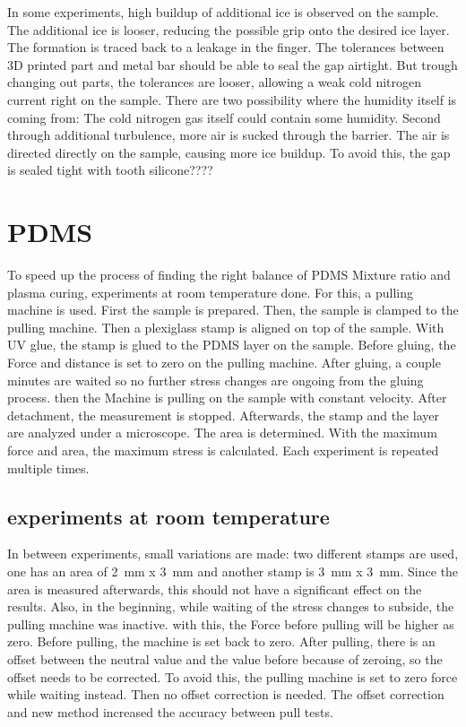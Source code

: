 In some experiments, high buildup of additional ice is observed on the sample. The additional ice is looser, reducing the possible grip onto the desired ice layer. The formation is traced back to a leakage in the finger. The tolerances between 3D printed part and metal bar should be able to seal the gap airtight. But trough changing out parts, the tolerances are looser, allowing a weak cold nitrogen current right on the sample. There are two possibility where the humidity itself is coming from: The cold nitrogen gas itself could contain some humidity. Second through additional turbulence, more air is sucked through the barrier. The air is directed directly on the sample, causing more ice buildup. To avoid this, the gap is sealed tight with tooth silicone????


\section{PDMS}

To speed up the process of finding the right balance of PDMS Mixture ratio and plasma curing, experiments at room temperature done. For this, a pulling machine is used. First the sample is prepared. Then, the sample is clamped to the pulling machine. Then a plexiglass stamp is aligned on top of the sample. With UV glue, the stamp is glued to the PDMS layer on the sample. Before gluing, the Force and distance is set to zero on the pulling machine. After gluing, a couple minutes are waited so no further stress changes are ongoing from the gluing process. then the Machine is pulling on the sample with constant velocity. After detachment, the measurement is stopped. Afterwards, the stamp and the layer are analyzed under a microscope. The area is determined. With the maximum force and area, the maximum stress is calculated. Each experiment is repeated multiple times.

\subsection{experiments at room temperature}

In between experiments, small variations are made: two different stamps are used, one has an area of \SI{2}{\milli\meter} x \SI{3}{\milli\meter} and another stamp is \SI{3}{\milli\meter} x \SI{3}{\milli\meter}. Since the area is measured afterwards, this should not have a significant effect on the results. Also, in the beginning, while waiting of the stress changes to subside, the pulling machine was inactive. with this, the Force before pulling will be higher as zero. Before pulling, the machine is set back to zero. After pulling, there is an offset between the neutral value and the value before because of zeroing, so the offset needs to be corrected. To avoid this, the pulling machine is set to zero force while waiting instead. Then no offset correction is needed. The offset correction and new method increased the accuracy between pull tests.

